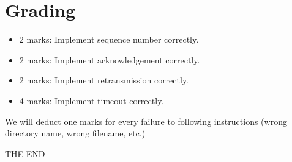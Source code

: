 \documentclass[a4paper,11pt]{exam}
\begin{document}
\section*{Grading}

\begin{itemize}
\item 2 marks: Implement sequence number correctly.
\item 2 marks: Implement acknowledgement correctly.
\item 2 marks: Implement retransmission correctly.
\item 4 marks: Implement timeout correctly.
\end{itemize}

We will deduct one marks for every failure to following instructions (wrong directory name, wrong filename, etc.)

\vfill
\center\Huge{THE END}
\end{document}
